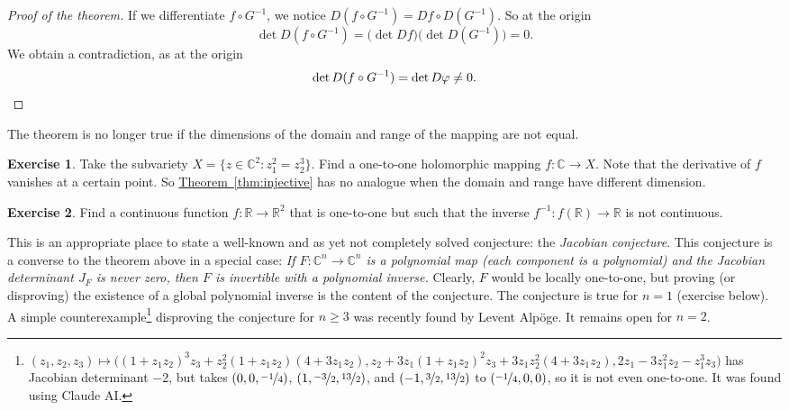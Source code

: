 \documentclass[12pt,openany]{book}
\newcommand{\C}{{\mathbb{C}}}
\newcommand{\R}{{\mathbb{R}}}
\newcommand{\myindex}[1]{#1\index{#1}}
\theoremstyle{plain}
\theoremstyle{remark}
\theoremstyle{definition}
\newenvironment{exbox}{%
    \def\FrameCommand{\vrule width 1pt \relax\hspace{10pt}}%
    \MakeFramed{\advance\hsize-\width\FrameRestore}%
}{%
    \endMakeFramed
}
\theoremstyle{exercise}
\newtheorem{exercise}{Exercise}[section]
\theoremstyle{example}
\newcommand{\thmref}[1]{\hyperref[#1]{Theorem~\ref*{#1}}}
\begin{document}
\begin{proof}[Proof of the theorem]
If we differentiate $f \circ G^{-1}$, we notice
$D(f \circ G^{-1}) = Df \circ D(G^{-1})$.
So at the origin
\begin{equation*}
\det D(f \circ G^{-1}) = \bigl(\det Df\bigr) \bigl(\det D(G^{-1})\bigr) = 0.
\end{equation*}
We obtain a contradiction, as at the origin
\begin{equation*}
\det
D(f \circ G^{-1})
= \det D\varphi \neq 0 . \qedhere
\end{equation*}
\end{proof}

The theorem is no longer true if the dimensions of the domain and range of the
mapping are not equal.

\begin{exbox}
\begin{exercise}
Take the subvariety
$X = \bigl\{ z \in \C^2 : z_1^2 = z_2^3 \bigr\}$.
Find a one-to-one holomorphic mapping $f \colon \C \to X$.
Note that the derivative of $f$ vanishes at a certain point.
So \thmref{thm:injective} has no analogue when the domain and range have
different dimension.
\end{exercise}

\begin{exercise}
Find a continuous function $f \colon \R \to \R^2$ that is one-to-one but
such that the inverse $f^{-1} \colon f(\R) \to \R$ is not continuous.
\end{exercise}
\end{exbox}

\pagebreak[1]
This is an appropriate place to state a well-known and as yet not completely
solved conjecture:
the \emph{\myindex{Jacobian conjecture}}.
This conjecture is a converse to the theorem above in a special case:
\emph{If $F \colon \C^n \to \C^n$ is a polynomial map (each component is a
polynomial) and the Jacobian determinant $J_F$ is never zero, then $F$ is
invertible with a polynomial inverse.}
Clearly, $F$ would be locally one-to-one, but proving (or
disproving)
the existence of a global polynomial inverse is the content of the conjecture.
The conjecture is true for $n=1$ (exercise below).
A simple counterexample\footnote{%
$(z_1,z_2,z_3) \mapsto
\bigl((1+z_1z_2)^3 z_3 + z_2^2 (1+z_1z_2) (4+3z_1z_2),
z_2 + 3 z_1 (1+z_1z_2)^2  z_3 + 3 z_1 z_2^2 (4+3z_1z_2),
2 z_1 - 3 z_1^2 z_2 - z_1^3 z_3\bigr)$
has Jacobian determinant $-2$, but 
takes $(0, 0, \nicefrac{-1}{4})$,
$(1, \nicefrac{-3}{2}, \nicefrac{13}{2})$,
and $(-1, \nicefrac{3}{2}, \nicefrac{13}{2})$ to $(\nicefrac{-1}{4}, 0, 0)$,
so it is not even one-to-one.  It was found using Claude AI.}
disproving the conjecture for
$n \geq 3$ was recently found by Levent Alp\"oge.
It remains open for $n=2$.
\end{document}
